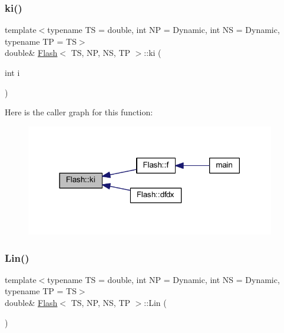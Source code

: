 \subsubsection{\texorpdfstring{ki()}{ki()}}
{\footnotesize\ttfamily template$<$typename TS = double, int NP = Dynamic, int NS = Dynamic, typename TP = TS$>$ \\
double\& \mbox{\hyperlink{class_flash}{Flash}}$<$ TS, NP, NS, TP $>$\+::ki (\begin{DoxyParamCaption}\item[{int}]{i }\end{DoxyParamCaption})\hspace{0.3cm}{\ttfamily [inline]}}

Here is the caller graph for this function\+:
\nopagebreak
\begin{figure}[H]
\begin{center}
\leavevmode
\includegraphics[width=309pt]{class_flash_a5ae7d29d13281fafa84cc9c247461fda_icgraph}
\end{center}
\end{figure}
\mbox{\label{class_flash_a8bfde1e00ab93b6a9b07deead0d3525a}} 
\subsubsection{\texorpdfstring{Lin()}{Lin()}}
{\footnotesize\ttfamily template$<$typename TS = double, int NP = Dynamic, int NS = Dynamic, typename TP = TS$>$ \\
double\& \mbox{\hyperlink{class_flash}{Flash}}$<$ TS, NP, NS, TP $>$\+::Lin (\begin{DoxyParamCaption}{ }\end{DoxyParamCaption})\hspace{0.3cm}{\ttfamily [inline]}}

